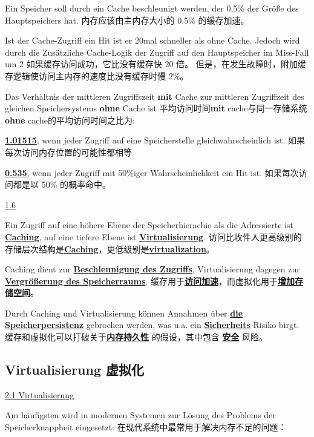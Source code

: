\documentclass[fleqn]{article}
\begin{document}
\noindent Ein Speicher soll durch ein Cache beschleunigt werden, der 0,5\% der Größe des Hauptspeichers hat.
内存应该由主内存大小的 0.5\% 的缓存加速。

\noindent Ist der Cache-Zugriff ein Hit ist er 20mal schneller als ohne Cache. Jedoch wird durch die Zusätzliche Cache-Logik der Zugriff auf den Hauptspeicher im Miss-Fall um 2%
如果缓存访问成功，它比没有缓存快 20 倍。 但是，在发生故障时，附加缓存逻辑使访问主内存的速度比没有缓存时慢 2\%。

\noindent Das Verhältnis der mittleren Zugriffszeit \textbf{mit} Cache zur mittleren Zugriffzeit des gleichen Speichersystems \textbf{ohne} Cache ist
平均访问时间\textbf{mit} cache与同一存储系统\textbf{ohne} cache的平均访问时间之比为:

\uline{\textbf{1.01515}}, wenn jeder Zugriff auf eine Speicherstelle gleichwahrscheinlich ist. 如果每次访问内存位置的可能性都相等
 	
\uline{\textbf{0.535}}, wenn jeder Zugriff mit 50\%iger Wahrscheinlichkeit ein Hit ist. 如果每次访问都是以 50\% 的概率命中。

\noindent\uline{1.6}

Ein Zugriff auf eine höhere Ebene der Speicherhierachie als die Adressierte ist \uline{\textbf{Caching}}, auf eine tiefere Ebene ist \uline{\textbf{Virtualisierung}}.
访问比收件人更高级别的存储层次结构是\uline{\textbf{Caching}}，更低级别是\uline{\textbf{virtualization}}。

Caching dient zur \uline{\textbf{Beschleunigung des Zugriffs}}, Virtualisierung dagegen zur \uline{\textbf{Vergrößerung des Speicherraums}}.
缓存用于\uline{\textbf{访问加速}}，而虚拟化用于\uline{\textbf{增加存储空间}}。

Durch Caching und Virtualisierung können Annahmen über \uline{\textbf{die Speicherpersistenz}} gebrochen werden, was u.a. ein \uline{\textbf{Sicherheits}}-Risiko birgt.
缓存和虚拟化可以打破关于\uline{\textbf{内存持久性}} 的假设，其中包含 \uline{\textbf{安全}} 风险。


\subsection{Virtualisierung 虚拟化}

\noindent\uline{2.1 Virtualisierung}

\noindent Am häufigsten wird in modernen Systemen zur Lösung des Problems der Speicherknappheit eingesetzt: 
在现代系统中最常用于解决内存不足的问题：
\end{document}
